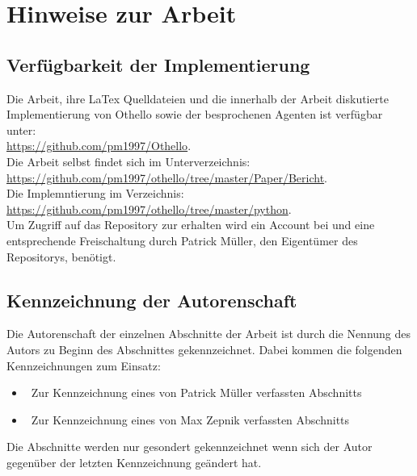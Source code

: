 \chapter*{Hinweise zur Arbeit}
\section*{Verfügbarkeit der Implementierung}
Die Arbeit, ihre LaTex Quelldateien und die innerhalb der Arbeit diskutierte Implementierung von Othello sowie der besprochenen Agenten ist verfügbar unter: 
\\\href{https://github.com/pm1997/Othello}{https://github.com/pm1997/Othello}.
\\Die Arbeit selbst findet sich im Unterverzeichnis:
\\\href{https://github.com/pm1997/othello/tree/master/Paper/Bericht}{https://github.com/pm1997/othello/tree/master/Paper/Bericht}.
\\Die Implemntierung im Verzeichnis:
\\\href{https://github.com/pm1997/othello/tree/master/python}{https://github.com/pm1997/othello/tree/master/python}.
\\Um Zugriff auf das Repository zur erhalten wird ein Account bei  und eine entsprechende Freischaltung durch Patrick Müller, den Eigentümer des Repositorys, benötigt.

\section*{Kennzeichnung der Autorenschaft}
Die Autorenschaft der einzelnen Abschnitte der Arbeit ist durch die Nennung des Autors zu Beginn des Abschnittes gekennzeichnet. Dabei kommen die folgenden Kennzeichnungen zum Einsatz:
\begin{itemize}
\item \authorpatrick\ Zur Kennzeichnung eines von Patrick Müller verfassten Abschnitts
\item \authormax\ Zur Kennzeichnung eines von Max Zepnik verfassten Abschnitts
\end{itemize}
Die Abschnitte werden nur gesondert gekennzeichnet wenn sich der Autor gegenüber der letzten Kennzeichnung geändert hat.  